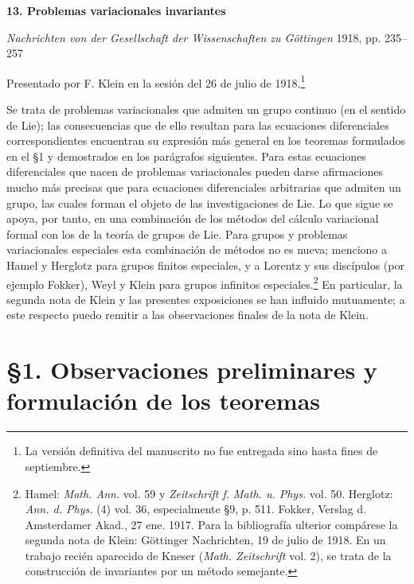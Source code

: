 \documentclass[11pt]{article}
\begin{document}
\begin{center}
{\Large\bfseries 13. Problemas variacionales invariantes}\par
\vspace{1.5em}
\emph{Nachrichten von der Gesellschaft der Wissenschaften zu Göttingen} 1918, pp. 235--257
\end{center}

\vspace{3em}
\begin{center}
Presentado por F. Klein en la sesión del 26 de julio de 1918.\footnote{La versión definitiva del manuscrito no fue entregada sino hasta fines de septiembre.}
\end{center}

Se trata de problemas variacionales que admiten un grupo continuo (en el sentido de Lie); las consecuencias que de ello resultan para las ecuaciones diferenciales correspondientes encuentran su expresión más general en los teoremas formulados en el \S{}1 y demostrados en los parágrafos siguientes. Para estas ecuaciones diferenciales que nacen de problemas variacionales pueden darse afirmaciones mucho más precisas que para ecuaciones diferenciales arbitrarias que admiten un grupo, las cuales forman el objeto de las investigaciones de Lie. Lo que sigue se apoya, por tanto, en una combinación de los métodos del cálculo variacional formal con los de la teoría de grupos de Lie. Para grupos y problemas variacionales especiales esta combinación de métodos no es nueva; menciono a Hamel y Herglotz para grupos finitos especiales, y a Lorentz y sus discípulos (por ejemplo Fokker), Weyl y Klein para grupos infinitos especiales.\footnote{Hamel: \emph{Math. Ann.} vol. 59 y \emph{Zeitschrift f. Math. u. Phys.} vol. 50. Herglotz: \emph{Ann. d. Phys.} (4) vol. 36, especialmente \S{}9, p. 511. Fokker, Verslag d. Amsterdamer Akad., 27 ene. 1917. Para la bibliografía ulterior compárese la segunda nota de Klein: Göttinger Nachrichten, 19 de julio de 1918. En un trabajo recién aparecido de Kneser (\emph{Math. Zeitschrift} vol. 2), se trata de la construcción de invariantes por un método semejante.} En particular, la segunda nota de Klein y las presentes exposiciones se han influido mutuamente; a este respecto puedo remitir a las observaciones finales de la nota de Klein.

\section*{\S{}1. Observaciones preliminares y formulación de los teoremas}
\end{document}
